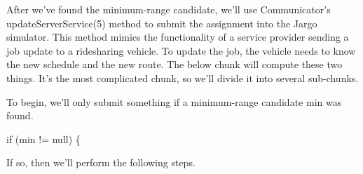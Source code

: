 After we've found the minimum-range candidate, we'll use {\Tt{}Communicator\nwendquote}'s
{\Tt{}updateServerService\nwendquote}(5) method to submit the assignment into the Jargo
simulator. This method mimics the functionality of a service provider sending a
job update to a ridesharing vehicle. To update the job, the vehicle needs to
know the new schedule and the new route. The below chunk will compute these two
things. It's the most complicated chunk, so we'll divide it into several
sub-chunks.

To begin, we'll only submit something if a minimum-range candidate {\Tt{}min\nwendquote} was
found.

\nwenddocs{}\endmoddef\nwstartdeflinemarkup{}\nwenddeflinemarkup
if (min != null) \{
\nwendcode{}\nwdocspar

If so, then we'll perform the following steps.

